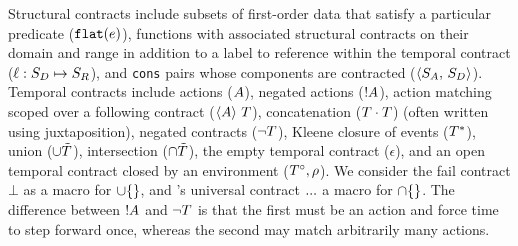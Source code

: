 Structural contracts include subsets of first-order data that satisfy a particular predicate (${\tt flat}(e)$), functions with associated structural contracts on their domain and range in addition to a label to reference within the temporal contract ($\ell : S_D \mapsto S_R$), and {\tt cons} pairs whose components are contracted ($\langle S_A,\, S_D\rangle$).
Temporal contracts include actions ($A$), negated actions (${}! A$), action matching scoped over a following contract ($\langle A\rangle\ T$), concatenation ($T \cdot T$) (often written using juxtaposition), negated contracts ($\neg T$), Kleene closure of events ($T^*$), union ($\cup \tilde{T}$), intersection ($\cap \tilde{T}$), the empty temporal contract ($\epsilon$), and an open temporal contract closed by an environment ($T^\circ, \rho$).
%
We consider the fail contract $\bot$ as a macro for $\cup \{\}$, and \dfm's universal contract ${\tt ...}$ a macro for $\cap \{\}$.
%
The difference between ${}! A$ and $\neg T$ is that the first must be an action and force time to step forward once, whereas the second may match arbitrarily many actions.

